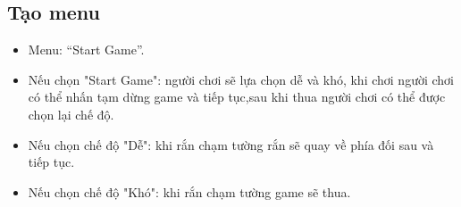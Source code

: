 \documentclass[../main-report.tex]{subfiles}
\begin{document}
\subsection{Tạo menu}
\begin{itemize}
    \item Menu: “Start Game”.
    \item Nếu chọn "Start Game": người chơi sẽ lựa chọn dễ và khó, khi chơi người chơi có thể nhấn tạm dừng game và tiếp tục,sau khi thua người chơi có thể được chọn lại chế độ.
    \item Nếu chọn chế độ "Dễ": khi rắn chạm tường rắn sẽ quay về phía đối sau và tiếp tục.
    \item Nếu chọn chế độ "Khó": khi rắn chạm tường game sẽ thua.
\end{itemize}
\end{document}
